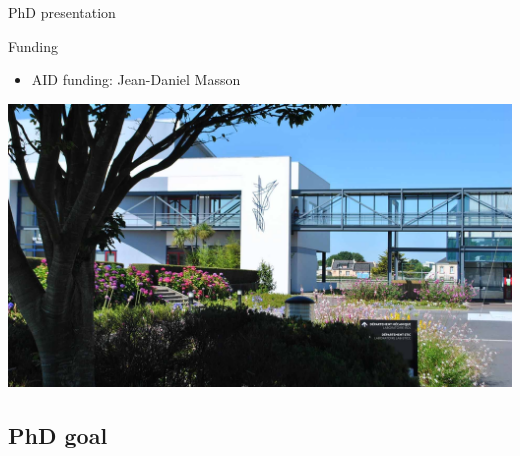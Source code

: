 \documentclass[10pt, xcolor={usenames, dvipsnames}]{beamer}
\begin{document}
\begin{frame}{PhD presentation}
\begin{minipage}[c]{0.58\textwidth}
                    \begin{block}{Funding}
                        \begin{itemize}
                            \item AID funding: Jean-Daniel Masson
                        \end{itemize}
                    \end{block}
                \end{minipage}
                \hfill
                \begin{minipage}[c]{0.4\textwidth}
                    \includegraphics[height=0.7\textheight, trim={24cm 0 16cm 0}, clip]{imgs/ensta.jpg}
                \end{minipage}
            \end{frame}

        \subsection{PhD goal}
\end{document}
